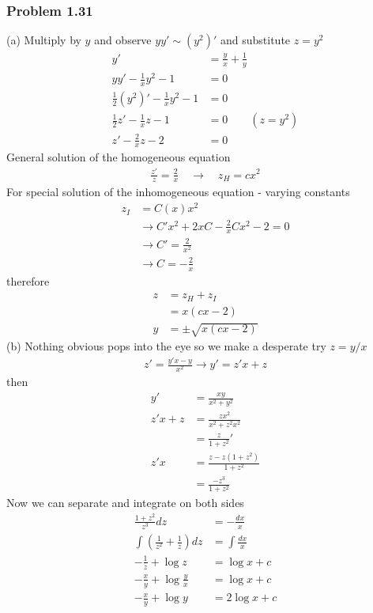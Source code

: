 \documentclass[10pt,a4paper]{book}
\theoremstyle{definition}
\begin{document}
\subsubsection{Problem 1.31}
(a) Multiply by $y$ and observe $yy'\sim(y^2)'$ and substitute $z=y^2$
\begin{align}
y'&=\frac{y}{x}+\frac{1}{y}\\
yy'-\frac{1}{x}y^2-1&=0\\
\frac{1}{2}(y^2)'-\frac{1}{x}y^2-1&=0\\
\frac{1}{2}z'-\frac{1}{x}z-1&=0\qquad(z=y^2)\\
z'-\frac{2}{x}z-2&=0
\end{align}
General solution of the homogeneous equation
\begin{align}
\frac{z'}{z}=\frac{2}{x}\quad\rightarrow\quad z_H=cx^2
\end{align}
For special solution of the inhomogeneous equation - varying constants
\begin{align}
z_I&=C(x)x^2\\
&\rightarrow C'x^2+2xC-\frac{2}{x}Cx^2-2=0\\
&\rightarrow C'=\frac{2}{x^2}\\
&\rightarrow C=-\frac{2}{x}
\end{align}
therefore
\begin{align}
z&=z_H+z_I\\
&=x(cx-2)\\
y&=\pm\sqrt{x(cx-2)}
\end{align}
(b) Nothing obvious pops into the eye so we make a desperate try $z=y/x$
\begin{align}
z'=\frac{y'x-y}{x^2}\rightarrow y'=z'x+z
\end{align}
then
\begin{align}
y'&=\frac{xy}{x^2+y^2}\\
z'x+z
&=\frac{zx^2}{x^2+z^2x^2}\\
&=\frac{z}{1+z^2}'\\
z'x&=\frac{z-z(1+z^2)}{1+z^2}\\
&=\frac{-z^3}{1+z^2}
\end{align}
Now we can separate and integrate on both sides
\begin{align}
\frac{1+z^2}{z^3}dz&=-\frac{dx}{x}\\
\int\left(\frac{1}{z^2}+\frac{1}{z}\right)dz&=\int\frac{dx}{x}\\
-\frac{1}{z}+\log z&=\log{x}+c\\
-\frac{x}{y}+\log\frac{y}{x}&=\log{x}+c\\
-\frac{x}{y}+\log y&=2\log{x}+c
\end{align}
\end{document}
